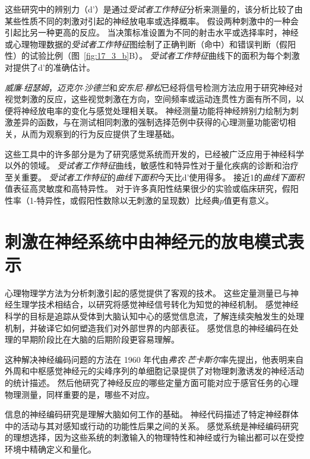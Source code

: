 \begin{proposition}
	\quad \quad 这些研究中的辨别力（d'）是通过\textit{受试者工作特征}分析来测量的，该分析比较了由某些性质不同的刺激对引起的神经放电率或选择概率。
	假设两种刺激中的一种会引起比另一种更高的反应。
	当决策标准设置为不同的射击水平或选择率时，神经或心理物理数据的\textit{受试者工作特征}图绘制了正确判断（命中）和错误判断（假阳性）的试验比例（图~\ref{fig:17_3_b}B）。
	\textit{受试者工作特征}曲线下的面积为每个刺激对提供了d'的准确估计。
	
	\quad \quad \textit{威廉$\cdot$纽瑟姆}，\textit{迈克尔$\cdot$沙德兰}和\textit{安东尼$\cdot$穆松}已经将信号检测方法应用于研究神经对视觉刺激的反应，这些视觉刺激在方向，空间频率或运动连贯性方面有所不同，以便将神经放电率的变化与感觉处理相关联。
	神经测量功能将神经辨别力绘制为刺激差异的函数，与在测试相同刺激的强制选择范例中获得的心理测量功能密切相关，从而为观察到的行为反应提供了生理基础。
	
	\quad \quad 这些工具中的许多部分是为了研究感觉系统而开发的，已经被广泛应用于神经科学以外的领域。
	\textit{受试者工作特征}曲线，敏感性和特异性对于量化疾病的诊断和治疗至关重要。
	\textit{受试者工作特征}的\textit{曲线下面积}今天比d'使用得多。
	接近1的\textit{曲线下面积}值表征高灵敏度和高特异性。
	对于许多真阳性结果很少的实验或临床研究，假阳性率（1-特异性，或假阳性数除以无刺激的呈现数）比经典$ p $值更有意义。
	
\end{proposition}



\section{刺激在神经系统中由神经元的放电模式表示}
心理物理学方法为分析刺激引起的感觉提供了客观的技术。 
这些定量测量已与神经生理学技术相结合，以研究将感觉神经信号转化为知觉的神经机制。 
感觉神经科学的目标是追踪从受体到大脑认知中心的感觉信息流，了解连续突触发生的处理机制，并破译它如何塑造我们对外部世界的内部表征。 
感觉信息的神经编码在处理的早期阶段比在大脑的后期阶段更容易理解。


这种解决神经编码问题的方法在 1960 年代由\textit{弗农$\cdot$芒卡斯尔}率先提出，他表明来自外周和中枢感觉神经元的尖峰序列的单细胞记录提供了对物理刺激诱发的神经活动的统计描述。
然后他研究了神经反应的哪些定量方面可能对应于感官任务的心理物理测量，同样重要的是，哪些不对应。


信息的神经编码研究是理解大脑如何工作的基础。
神经代码描述了特定神经群体中的活动与其对感知或行动的功能性后果之间的关系。 
感觉系统是神经编码研究的理想选择，因为这些系统的刺激输入的物理特性和神经或行为输出都可以在受控环境中精确定义和量化。


